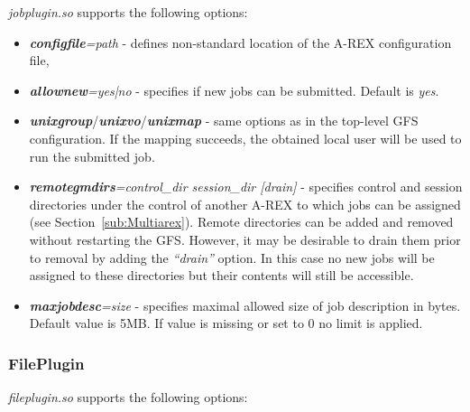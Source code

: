\documentclass{article}
\begin{document}
\textit{jobplugin.so} supports the following options:

\begin{itemize}
\item \textbf{\textit{configfile}}\textit{=path} - defines
  non-standard location of the A-REX configuration file,
\item \textbf{\textit{allownew}}\textit{=yes|no} - specifies if new
  jobs can be submitted. Default is \emph{yes}.
\item
  \textbf{\textit{unixgroup}}/\textbf{\textit{unixvo}}/\textbf{\textit{unixmap}}
  - same options as in the top-level GFS configuration. If the mapping
  succeeds, the obtained local user will be used to run the submitted
  job.
\item \textbf{\textit{remotegmdirs}}\textit{=control\_dir session\_dir
  [drain]} - specifies control and session directories under the
  control of another A-REX to which jobs can be assigned (see
  Section~\ref{sub:Multiarex}). Remote directories can be added and
  removed without restarting the GFS. However, it may be desirable to
  drain them prior to removal by adding the \emph{``drain''}
  option. In this case no new jobs will be assigned to these
  directories but their contents will still be accessible.
\item \textbf{\textit{maxjobdesc}}\textit{=size} - specifies maximal
  allowed size of job description in bytes. Default value is 5MB. If
  value is missing or set to 0 no limit is applied.
\end{itemize}

\subsubsection{FilePlugin}

\textit{fileplugin.so} supports the following options:
\end{document}
